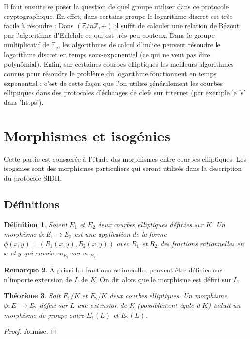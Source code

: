 \documentclass{article}
\theoremstyle{plain}%
\newtheorem{thm}{Théorème}[section]
\newtheorem{deff}[thm]{Définition}
\theoremstyle{definition}%
\newtheorem{rem}[thm]{Remarque}
\newcommand{\F}{\mathbb{F}}
\newcommand{\Z}{\mathbb{Z}}
\begin{document}
Il faut ensuite se poser la question de quel groupe utiliser dans ce protocole cryptographique. En effet, dans certains groupe le logarithme discret est très facile à résoudre : Dans $(\Z/n\Z, +)$ il suffit de calculer une relation de Bézout par l'algorithme d'Eulclide ce qui est très peu couteux. Dans le groupe multiplicatif de $\F_q$, les algorithmes de calcul d'indice peuvent résoudre le logarithme discret en temps sous-exponentiel (ce qui ne veut pas dire polynômial). Enfin, sur certaines courbes elliptiques les meilleurs algorithmes connus pour résoudre le problème du logarithme fonctionnent en temps exponentiel : c'est de cette façon que l'on utilise généralement les courbes elliptiques dans des protocoles d'échanges de clefs sur internet (par exemple le 's' dans 'https').


\section{Morphismes et isogénies}

Cette partie est consacrée à l'étude des morphismes entre courbes elliptiques. Les isogénies sont des morphismes particuliers qui seront utilisés dans la description du protocole SIDH.

\subsection{Définitions}

\begin{deff}
  Soient $E_1$ et $E_2$ deux courbes elliptiques définies sur $K$. Un morphisme $\phi : E_1\to  E_2$ est une application de la forme $\phi(x, y) = (R_1(x, y), R_2(x, y))$ avec $R_1$ et $R_2$ des fractions rationnelles en $x$ et $y$ qui envoie $\infty_{E_1}$ sur $\infty_{E_2}$.
\end{deff}

\begin{rem}
  A priori les fractions rationnelles peuvent être définies sur n'importe extension de $L$ de $K$. On dit alors que le morphisme est défini sur $L$.
\end{rem}

\begin{thm}
  Soit $E_1/K$ et $E_2/K$ deux courbes elliptiques. Un morphisme $\phi : E_1\to  E_2$ défini sur $L$ une extension de $K$ (possiblement égale à $K$) induit un morphisme de groupe entre $E_1(L)$ et $E_2(L)$. 
\end{thm}

\begin{proof}
  Admise. 
\end{proof}
\end{document}
